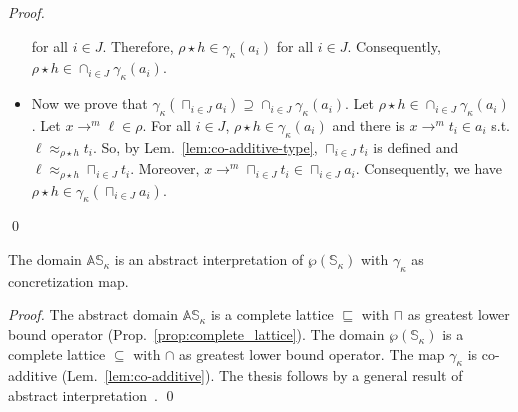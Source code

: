 \begin{proof}
\begin{itemize}
    for all $i\in J$. Therefore, $\rho\star h\in\gamma_\kappa(a_i)$
    for all $i\in J$. Consequently,
    $\rho\star h\in\cap_{i\in J}\gamma_\kappa(a_i)$.
    \item Now we prove that
    $\gamma_\kappa(\sqcap_{i\in J}a_i)\supseteq\cap_{i\in J}\gamma_\kappa(a_i)$.
    Let $\rho\star h\in\cap_{i\in J}\gamma_\kappa(a_i)$.
    Let $x\to^m\ell\in\rho$.
    For all $i\in J$, $\rho\star h\in\gamma_\kappa(a_i)$ and there
    is $x\to^m t_i\in a_i$ s.t. $\ell\approx_{\rho\star h}t_i$.
    So, by Lem.~\ref{lem:co-additive-type}, $\sqcap_{i\in J}t_i$ is defined
    and $\ell\approx_{\rho\star h}\sqcap_{i\in J}t_i$.
    Moreover, $x\to^m \sqcap_{i\in J}t_i \in \sqcap_{i\in J}a_i$.
    Consequently, we have $\rho\star h\in\gamma_\kappa(\sqcap_{i\in J}a_i)$.
  \end{itemize}
  \qed
\end{proof}

\begin{proposition}\label{prop:abstract_interpretation}
  The domain $\mathbb{AS}_\kappa$ is an abstract interpretation of $\wp(\mathbb{S}_\kappa)$
  with $\gamma_\kappa$ as concretization map.
\end{proposition}
\begin{proof}
  The abstract domain $\mathbb{AS}_\kappa$ is a complete lattice \wrt $\sqsubseteq$
  with $\sqcap$ as greatest lower bound operator (Prop.~\ref{prop:complete_lattice}).
  The domain $\wp(\mathbb{S}_\kappa)$ is a complete lattice \wrt $\subseteq$ with $\cap$ as
  greatest lower bound operator. The map $\gamma_\kappa$ is co-additive (Lem.~\ref{lem:co-additive}).
  The thesis follows by a general result of abstract interpretation~\cite{CousotC77}.
  \qed
\end{proof}
